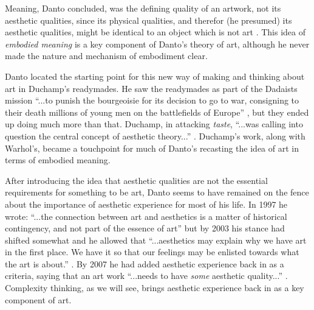         Meaning, Danto concluded, was the defining quality of an artwork, not its aesthetic qualities, since its physical qualities, and therefor (he presumed) its aesthetic qualities, might be identical to an object which is not art \citep[p.125]{DantoEmbdMnngs2007}. This idea of \emph{embodied meaning} is a key component of Danto's theory of art, although he never made the nature and mechanism of embodiment clear.
        
        Danto located the starting point for this new way of making and thinking about art in Duchamp's readymades. He saw the readymades as part of the Dadaists mission “...to punish the bourgeoisie for its decision to go to war, consigning to their death millions of young men on the battlefields of Europe” \citep[p.26]{DantoWhtArtIs2013}, but they ended up doing much more than that. Duchamp, in attacking \emph{taste}, “...was calling into question the central concept of aesthetic theory...” \citep[pp.25–26]{DantoWhtArtIs2013}. Duchamp's work, along with Warhol's, became a touchpoint for much of Danto's recasting the idea of art in terms of embodied meaning.

        After introducing the idea that aesthetic qualities are not the essential requirements for something to be art, Danto seems to have remained on the fence about the importance of aesthetic experience for most of his life. In 1997 he wrote: “...the connection between art and aesthetics is a matter of historical contingency, and not part of the essence of art”\citep[p.25]{DantoAftrEndOfArt2014} but by 2003 his stance had shifted somewhat and he allowed that “...aesthetics may explain why we have art in the first place. We have it so that our feelings may be enlisted towards what the art is about.” \citep[p.59]{DantoThAbsOfBty2003}. By 2007 he had added aesthetic experience back in as a criteria, saying that an art work “...needs to have \emph{some} aesthetic quality...” \citep[p.125]{DantoEmbdMnngs2007} \cite[p. XXX]{DantoThAbsOfBty2003}. Complexity thinking, as we will see, brings aesthetic experience back in as a key component of art.

